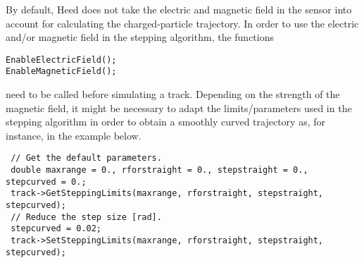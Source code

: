 By default, Heed does not take the electric and magnetic field in the sensor into account for 
calculating the charged-particle trajectory. In order to use the electric and/or magnetic field  
in the stepping algorithm, the functions 
\begin{lstlisting}
EnableElectricField();
EnableMagneticField();
\end{lstlisting}
need to be called before simulating a track.
Depending on the strength of the magnetic field, it might be necessary to adapt the 
limits/parameters used in the stepping algorithm in order to obtain a smoothly curved 
trajectory as, for instance, in the example below.
\begin{lstlisting}
 // Get the default parameters.
 double maxrange = 0., rforstraight = 0., stepstraight = 0., stepcurved = 0.;
 track->GetSteppingLimits(maxrange, rforstraight, stepstraight, stepcurved);
 // Reduce the step size [rad]. 
 stepcurved = 0.02;
 track->SetSteppingLimits(maxrange, rforstraight, stepstraight, stepcurved);
\end{lstlisting} 

